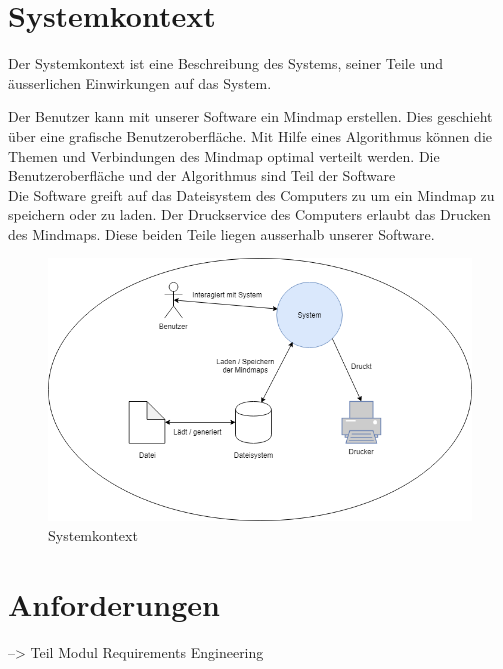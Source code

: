 \section{Systemkontext}
\label{sec:systemkontext}
Der Systemkontext ist eine Beschreibung des Systems, seiner Teile und äusserlichen Einwirkungen auf das System.

Der Benutzer kann mit unserer Software ein Mindmap erstellen. Dies geschieht über eine grafische Benutzeroberfläche. Mit Hilfe eines Algorithmus können die Themen und Verbindungen des Mindmap optimal verteilt werden. Die Benutzeroberfläche und der Algorithmus sind Teil der Software\\
Die Software greift auf das Dateisystem des Computers zu um ein Mindmap zu speichern oder zu laden. Der Druckservice des Computers erlaubt das Drucken des Mindmaps. Diese beiden Teile liegen ausserhalb unserer Software.

\begin{figure}[H]
	\centering
		\includegraphics[width=\textwidth]{images/Systemkontext.png}
	\caption{Systemkontext}
	\label{fig:systemkontext}
\end{figure}

\section{Anforderungen}
\label{sec:anforderungen}
--> Teil Modul Requirements Engineering
